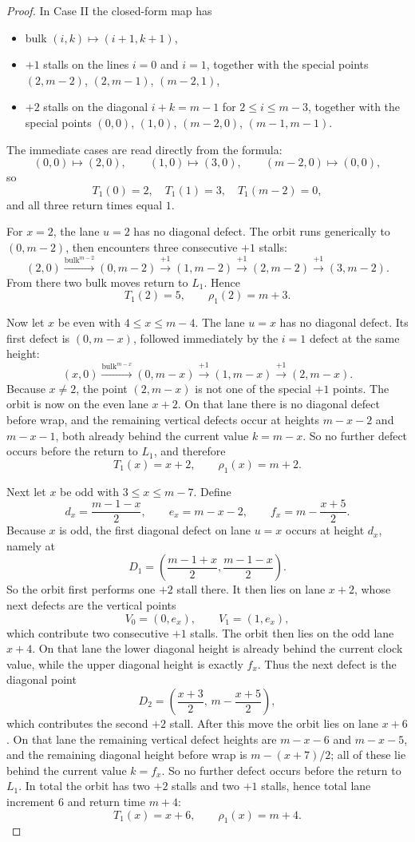 \documentclass[11pt]{article}
\newcommand{\bulk}{\mathrm{bulk}}   %
\begin{document}
\begin{proof}
In Case II the closed-form map has
\begin{itemize}[leftmargin=2em]
\item bulk $(i,k)\mapsto(i+1,k+1)$,
\item $+1$ stalls on the lines $i=0$ and $i=1$, together with the special points
$(2,m-2)$, $(2,m-1)$, $(m-2,1)$,
\item $+2$ stalls on the diagonal $i+k=m-1$ for $2\le i\le m-3$, together with the special points
$(0,0)$, $(1,0)$, $(m-2,0)$, $(m-1,m-1)$.
\end{itemize}

The immediate cases are read directly from the formula:
\[
(0,0)\mapsto(2,0),\qquad (1,0)\mapsto(3,0),\qquad (m-2,0)\mapsto(0,0),
\]
so
\[
T_1(0)=2,\quad T_1(1)=3,\quad T_1(m-2)=0,
\]
and all three return times equal $1$.

For $x=2$, the lane $u=2$ has no diagonal defect.
The orbit runs generically to $(0,m-2)$, then encounters three consecutive $+1$ stalls:
\[
(2,0)\xrightarrow{\bulk^{m-2}}(0,m-2)\xrightarrow{+1}(1,m-2)\xrightarrow{+1}(2,m-2)\xrightarrow{+1}(3,m-2).
\]
From there two bulk moves return to $L_1$.
Hence
\[
T_1(2)=5,\qquad \rho_1(2)=m+3.
\]

Now let $x$ be even with $4\le x\le m-4$.
The lane $u=x$ has no diagonal defect.
Its first defect is $(0,m-x)$, followed immediately by the $i=1$ defect at the same height:
\[
(x,0)\xrightarrow{\bulk^{m-x}}(0,m-x)\xrightarrow{+1}(1,m-x)\xrightarrow{+1}(2,m-x).
\]
Because $x\neq 2$, the point $(2,m-x)$ is not one of the special $+1$ points.
The orbit is now on the even lane $x+2$.
On that lane there is no diagonal defect before wrap, and the remaining vertical defects occur at heights
$m-x-2$ and $m-x-1$, both already behind the current value $k=m-x$.
So no further defect occurs before the return to $L_1$, and therefore
\[
T_1(x)=x+2,\qquad \rho_1(x)=m+2.
\]

Next let $x$ be odd with $3\le x\le m-7$.
Define
\[
d_x=\frac{m-1-x}{2},\qquad e_x=m-x-2,\qquad f_x=m-\frac{x+5}{2}.
\]
Because $x$ is odd, the first diagonal defect on lane $u=x$ occurs at height $d_x$, namely at
\[
D_1=\left(\frac{m-1+x}{2},\frac{m-1-x}{2}\right).
\]
So the orbit first performs one $+2$ stall there.
It then lies on lane $x+2$, whose next defects are the vertical points
\[
V_0=(0,e_x),\qquad V_1=(1,e_x),
\]
which contribute two consecutive $+1$ stalls.
The orbit then lies on the odd lane $x+4$.
On that lane the lower diagonal height is already behind the current clock value, while the upper diagonal
height is exactly $f_x$.
Thus the next defect is the diagonal point
\[
D_2=\left(\frac{x+3}{2},\,m-\frac{x+5}{2}\right),
\]
which contributes the second $+2$ stall.
After this move the orbit lies on lane $x+6$.
On that lane the remaining vertical defect heights are $m-x-6$ and $m-x-5$, and the remaining diagonal
height before wrap is $m-(x+7)/2$; all of these lie behind the current value $k=f_x$.
So no further defect occurs before the return to $L_1$.
In total the orbit has two $+2$ stalls and two $+1$ stalls, hence total lane increment $6$ and return time
$m+4$:
\[
T_1(x)=x+6,\qquad \rho_1(x)=m+4.
\]


\end{proof}
\end{document}
